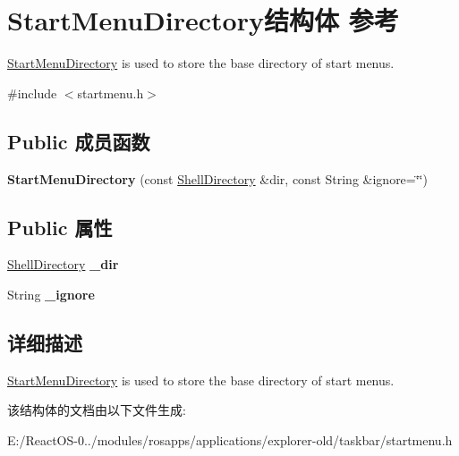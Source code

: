 \hypertarget{struct_start_menu_directory}{}\section{Start\+Menu\+Directory结构体 参考}
\label{struct_start_menu_directory}


\hyperlink{struct_start_menu_directory}{Start\+Menu\+Directory} is used to store the base directory of start menus.  




{\ttfamily \#include $<$startmenu.\+h$>$}

\subsection*{Public 成员函数}
\begin{DoxyCompactItemize}
\item 
\mbox{\label{struct_start_menu_directory_a58e59665b2857a40162c5da769c72045}} 
{\bfseries Start\+Menu\+Directory} (const \hyperlink{struct_shell_directory}{Shell\+Directory} \&dir, const String \&ignore=\char`\"{}\char`\"{})
\end{DoxyCompactItemize}
\subsection*{Public 属性}
\begin{DoxyCompactItemize}
\item 
\mbox{\label{struct_start_menu_directory_a9f5df6bb955003e21e4590cbd305e562}} 
\hyperlink{struct_shell_directory}{Shell\+Directory} {\bfseries \+\_\+dir}
\item 
\mbox{\label{struct_start_menu_directory_a6ea77fafeaa16bc078f0bf1bf8d487db}} 
String {\bfseries \+\_\+ignore}
\end{DoxyCompactItemize}


\subsection{详细描述}
\hyperlink{struct_start_menu_directory}{Start\+Menu\+Directory} is used to store the base directory of start menus. 

该结构体的文档由以下文件生成\+:\begin{DoxyCompactItemize}
\item 
E\+:/\+React\+O\+S-\/0../modules/rosapps/applications/explorer-\/old/taskbar/startmenu.\+h\end{DoxyCompactItemize}

